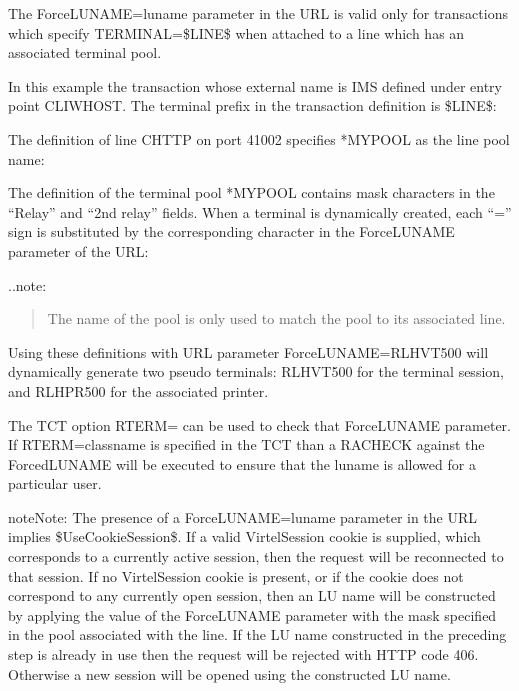 \documentclass[letterpaper,10pt,english]{sphinxmanual}
\begin{document}
\sphinxAtStartPar
The ForceLUNAME=luname parameter in the URL is valid only for transactions which specify TERMINAL=\$LINE\$ when attached to a line which has an associated terminal pool.

\sphinxAtStartPar
In this example the transaction whose external name is IMS defined under entry point CLIWHOST. The terminal prefix in the transaction definition is \$LINE\$:

\sphinxAtStartPar
{}

\sphinxAtStartPar
The definition of line C\sphinxhyphen{}HTTP on port 41002 specifies *MYPOOL as the line pool name:

\sphinxAtStartPar
{}

\sphinxAtStartPar
The definition of the terminal pool *MYPOOL contains mask characters in the “Relay” and “2nd relay” fields. When a terminal is dynamically created, each “=” sign is substituted by the corresponding character in the ForceLUNAME parameter of the URL:

\sphinxAtStartPar
{}

\sphinxAtStartPar
..note:
\begin{quote}

\sphinxAtStartPar
The name of the pool is only used to match the pool to its associated line.
\end{quote}

\sphinxAtStartPar
Using these definitions with URL parameter ForceLUNAME=RLHVT500 will dynamically generate two pseudo\sphinxhyphen{} terminals: RLHVT500 for the terminal session, and RLHPR500 for the associated printer.

\sphinxAtStartPar
The TCT option RTERM= can be used to check that ForceLUNAME parameter. If RTERM=classname is specified in the TCT than a RACHECK against the ForcedLUNAME will be executed to ensure that the luname is allowed for a particular user.

\begin{sphinxadmonition}{note}{Note:}
\sphinxAtStartPar
The presence of a ForceLUNAME=luname parameter in the URL implies \$UseCookieSession\$. If a valid VirtelSession cookie is supplied, which corresponds to a currently active session, then the request will be reconnected to that session. If no VirtelSession cookie is present, or if the cookie does not correspond to any currently open session, then an LU name will be constructed by applying the value of the ForceLUNAME parameter with the mask specified in the pool associated with the line. If the LU name constructed in the preceding step is already in use then the request will be rejected with HTTP code 406. Otherwise a new session will be opened using the constructed LU name.
\end{sphinxadmonition}
\end{document}
